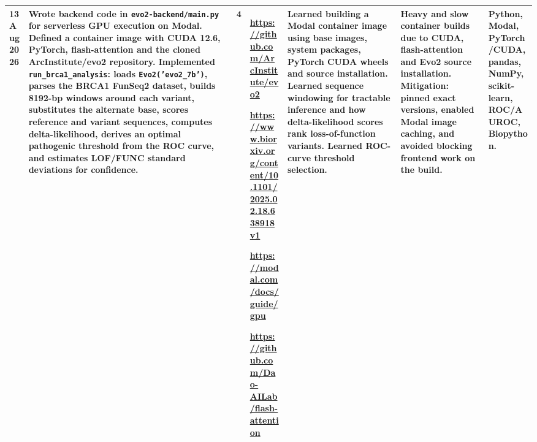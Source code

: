 \documentclass[8pt,a4paper]{article}
\begin{document}
\begin{longtable}{|
    D{1.25cm}|
    D{4.10cm}|
    D{0.70cm}|
    D{2.90cm}|
    D{2.90cm}|
    D{3.00cm}|
    D{2.95cm}|
}
13 Aug 2026 &
Wrote backend code in \texttt{evo2-backend/main.py} for serverless GPU execution on Modal. Defined a container image with CUDA 12.6, PyTorch, flash-attention and the cloned ArcInstitute/evo2 repository. Implemented \texttt{run\_brca1\_analysis}: loads \texttt{Evo2('evo2\_7b')}, parses the BRCA1 FunSeq2 dataset, builds 8192-bp windows around each variant, substitutes the alternate base, scores reference and variant sequences, computes delta-likelihood, derives an optimal pathogenic threshold from the ROC curve, and estimates LOF/FUNC standard deviations for confidence. &
4 &
\url{https://github.com/ArcInstitute/evo2}
\par
\url{https://www.biorxiv.org/content/10.1101/2025.02.18.638918v1}
\par
\url{https://modal.com/docs/guide/gpu}
\par
\url{https://github.com/Dao-AILab/flash-attention}
&
Learned building a Modal container image using base images, system packages, PyTorch CUDA wheels and source installation. Learned sequence windowing for tractable inference and how delta-likelihood scores rank loss-of-function variants. Learned ROC-curve threshold selection. &
Heavy and slow container builds due to CUDA, flash-attention and Evo2 source installation. Mitigation: pinned exact versions, enabled Modal image caching, and avoided blocking frontend work on the build. &
Python, Modal, PyTorch/CUDA, pandas, NumPy, scikit-learn, ROC/AUROC, Biopython. \\
\hline


\end{longtable}
\end{document}
